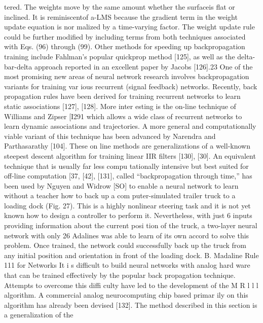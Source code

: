 \documentclass[11pt,a4paper,twocolumn]{article}
\begin{document}
{{\newpage


tered. The weights move by the same amount whether the 
surfaceis flat or inclined. It is reminiscentof a-LMS because 
the gradient term in the weight update equation is nor
malized by a time-varying factor. The weight update rule 
could be further modified by including terms from both 
techniques associated with Eqs. (96) through (99). Other 
methods for speeding up backpropagation training include 
Fahlman’s popular quickprop method [125], as well as the 
delta-bar-delta approach reported in an excellent paper by 
Jacobs [126].23 
One of the most promising new areas of neural network 
research involves backpropagation variants for training var
ious recurrent (signal feedback) networks. Recently, back
propagation rules have been derived for training recurrent 
networks to learn static associations [127], [128]. More inter
esting is the on-line technique of Williams and Zipser [I291 
which allows a wide class of recurrent networks to learn 
dynamic associations and trajectories. A more general and 
computationally viable variant of this technique has been 
advanced by Narendra and Parthasarathy [104]. These on
line methods are generalizations of a well-known steepest
descent algorithm for training linear IIR filters [130], [30]. 
An equivalent technique that is usually far less compu
tationally intensive but best suited for off-line computation 
[37, [42], [131], called “backpropagation through time,” has 
been used by Nguyen and Widrow [SO] to enable a neural 
network to learn without a teacher how to back up a com
puter-simulated trailer truck to a loading dock (Fig. 27). This 
is a highly nonlinear steering task and it is not yet known 
how to design a controller to perform it. Nevertheless, with 
just 6 inputs providing information about the current posi
tion of the truck, a two-layer neural network with only 26 
Adalines was able to learn of its own accord to solve this 
problem. Once trained, the network could successfully 
back up the truck from any initial position and orientation 
in front of the loading dock. 
B. Madaline Rule 111 for Networks 
It i s  difficult to build neural networks with analog hard
ware that can be trained effectively by the popular back
propagation technique. Attempts to overcome this diffi
culty have led to the development of the M R l l l  algorithm. 
A commercial analog neurocomputing chip based primar
ily on this algorithm has already been devised [132]. The 
method described in this section is a generalization of the 
}}
\end{document}
